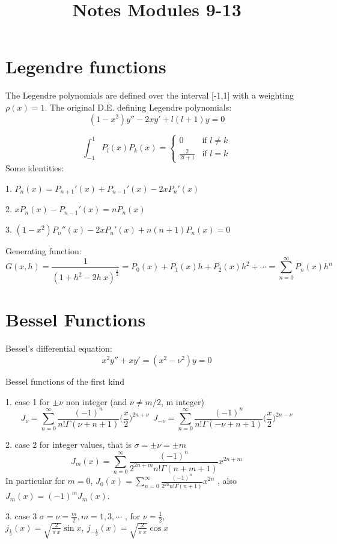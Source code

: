 \documentclass[12pt,twoside]{article}
\title{Notes Modules 9-13}
\begin{document}

\section{Legendre functions}
The Legendre polynomials are defined over the interval [-1,1] with a weighting $\rho(x)=1$.
The original D.E. defining Legendre polynomials:
\[
	(1-x^2) y'' -2 x y'  + l (l+1) y = 0
\]

\[
 \int_{-1}^{1} P_l(x) P_k(x) = 
  \begin{cases} 
   0 				& \text{if } l \neq k \\
   \frac{2}{2l+1}       & \text{if } l = k
  \end{cases}
\]
Some identities:
\bi
	\item [1.] $P_n(x) = P_{n+1}'(x) + P_{n - 1}'(x) -2x P_n'(x)$
	\item [2.] $x P_n(x) - P_{n-1}'(x) = n P_n(x)$
	\item[3.]  $(1-x^2) P_n''(x) -2 x P_n'(x) + n (n+1) P_n(x) =0$
\ei

Generating function:
\[
	G(x,h) = \frac{1}{(1+h^2 -2 h~x)^{\frac{1}{2}}} = P_0(x) + P_1(x) h + P_2(x) h^2 + \cdots = \sum_{n=0}^{\infty}P_n(x) h^n
\]

\section{Bessel Functions}
Bessel's differential equation:
\[
	x^2 y'' + x y' = (x^2 - \nu^2) y = 0
\]

Bessel functions of the first kind
\bi
	\item [1.] case 1 for $\pm\nu$ non integer (and $\nu \neq m /2$, m integer)
\[
	J_\nu = \sum_{n=0}^\infty \frac{ (-1)^n } {n! \Gamma(\nu + n + 1) } \bigg( \frac{x}{2}\bigg)^{2n+\nu} ~ ~  J_{-\nu} = \sum_{n=0}^\infty \frac{ (-1)^n } {n! \Gamma(-\nu + n + 1) } \bigg( \frac{x}{2}\bigg)^{2n-\nu} 
\]
	\item [2.] case 2 for integer values, that is $\sigma = \pm \nu = \pm m$
\[
	J_m(x) = \sum_{n=0}^\infty \frac{ (-1)^n } {2^{2n+m} n! \Gamma(n + m + 1) } x^{2n+m}
\]
In particular for $m=0$, $J_0(x) =\sum_{n=0}^\infty \frac{ (-1)^n } {2^{2n} n! \Gamma(n + 1) } x^{2n}$
, also $J_m(x) = (-1)^m J_m(x)$.
	\item [3.] case 3 $\sigma = \nu = \frac{m}{2}, m = 1,3, \cdots$
	, for $\nu=\frac{1}{2}$, $j_{\frac{1}{2}}(x) = \sqrt{\frac{2}{\pi~x}} \sin{x}, ~ j_{-\frac{1}{2}}(x) = \sqrt{\frac{2}{\pi~x}} \cos{x}$
\ei
\end{document}

